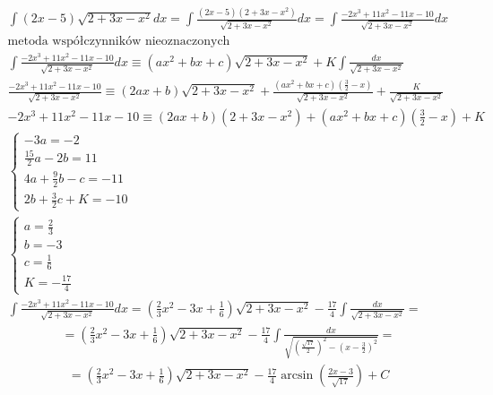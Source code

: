 \begin{gather*}\int (2x-5)\sqrt{2+3x-x^2}dx = \int \frac{(2x-5)(2+3x-x^2)}{\sqrt{2+3x-x^2}}dx = \int \frac{-2x^3+11x^2-11x-10}{\sqrt{2+3x-x^2}}dx \\
  \text{metoda współczynników nieoznaczonych} \\
  \int \frac{-2x^3+11x^2-11x-10}{\sqrt{2+3x-x^2}}dx \equiv (ax^2+bx+c)\sqrt{2+3x-x^2}+K\int \frac{dx}{\sqrt{2+3x-x^2}} \\
 \frac{-2x^3+11x^2-11x-10}{\sqrt{2+3x-x^2}} \equiv (2ax+b)\sqrt{2+3x-x^2}+\frac{(ax^2+bx+c)(\frac{3}{2}-x)}{\sqrt{2+3x-x^2}}+ \frac{K}{\sqrt{2+3x-x^2}} \\
-2x^3+11x^2-11x-10 \equiv (2ax+b)(2+3x-x^2)+(ax^2+bx+c)(\frac{3}{2}-x)+K \\
\begin{cases} -3a=-2 \\ \frac{15}{2}a-2b=11 \\ 4a+\frac{9}{2}b-c=-11 \\ 2b+\frac{3}{2}c+K=-10 \end{cases} \\
\begin{cases} a=\frac{2}{3} \\ b=-3 \\ c=\frac{1}{6} \\ K=-\frac{17}{4} \end{cases} \\
\int \frac{-2x^3+11x^2-11x-10}{\sqrt{2+3x-x^2}}dx = (\frac{2}{3}x^2-3x+\frac{1}{6})\sqrt{2+3x-x^2}-\frac{17}{4}\int \frac{dx}{\sqrt{2+3x-x^2}} = \end{gather*}
\begin{gather*}= (\frac{2}{3}x^2-3x+\frac{1}{6})\sqrt{2+3x-x^2}-\frac{17}{4}\int \frac{dx}{\sqrt{(\frac{\sqrt{17}}{2})^2-(x-\frac{3}{2})^2}} = \end{gather*}
\begin{gather*}= (\frac{2}{3}x^2-3x+\frac{1}{6})\sqrt{2+3x-x^2}-\frac{17}{4}\arcsin\left(\frac{2x-3}{\sqrt{17}}\right)+C\end{gather*}



